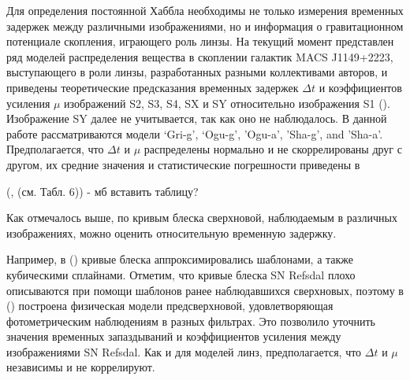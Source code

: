 Для определения постоянной Хаббла необходимы не только измерения временных задержек между различными изображениями, но и информация о гравитационном потенциале скопления, играющего роль линзы. На текущий момент представлен ряд моделей распределения вещества в скоплении галактик MACS J1149+2223, выступающего в роли линзы, разработанных разными коллективами авторов, и приведены теоретические предсказания временных задержек $\Delta t$ и коэффициентов усиления $\mu$ изображений S2, S3, S4, SX и SY относительно изображения S1 (\cite{treu2016}). Изображение SY далее не учитывается, так как оно не наблюдалось. В данной работе рассматриваются модели ‘Gri-g’, ‘Ogu-g’, ’Ogu-a’, ’Sha-g’, and ’Sha-a’. Предполагается, что $\Delta t$ и $\mu$ распределены нормально и не скоррелированы друг с другом, их средние значения и статистические погрешности приведены в

(\cite{treu2016}, (см. Табл. 6)) - мб вставить таблицу?  

Как отмечалось выше, по кривым блеска сверхновой, наблюдаемым в различных изображениях, можно оценить относительную временную задержку.



 


Например, в (\cite{rodney2016}) кривые блеска аппроксимировались шаблонами, а также кубическими сплайнами. Отметим, что кривые блеска SN Refsdal плохо описываются при помощи шаблонов ранее наблюдавшихся сверхновых, поэтому в (\cite{petrnat2020}) построена физическая модели предсверхновой, удовлетворяющая фотометрическим наблюдениям в разных фильтрах. Это позволило уточнить значения временных запаздываний и коэффициентов усиления между изображениями SN Refsdal. Как и для моделей линз, предполагается, что $\Delta t$ и $\mu$ независимы и не коррелируют.

